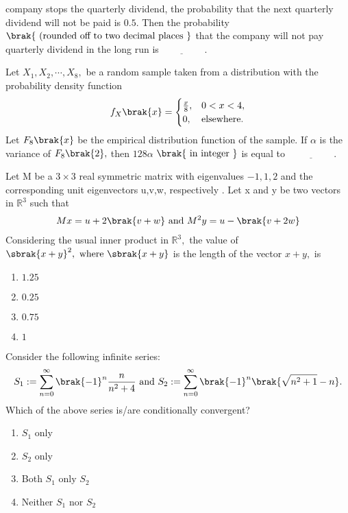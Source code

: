 company stops the quarterly dividend, the probability that the next quarterly dividend will not be paid is $0.5.$ Then the probability $\brak{\text{ (rounded
off to two decimal places }}$ that the company will not pay quarterly dividend in the long run is$\underline{\hspace{2cm}}.$
\bigskip
\item Let $X_{1},X_{2},\cdots,X_{8},$ be a random sample taken from a distribution with the probability density function
\begin{align*}
    f_{X}\brak{x} = 
\begin{cases} 
\frac{x}{8}, & 0 < x < 4, \\
0, & \text{elsewhere}.
\end{cases}
\end{align*}
Let $F_{8}\brak{x}$ be the empirical distribution function of the sample. If $\alpha$ is the variance of  $F_{8}\brak{2},$ then $128\alpha$  $\brak{\text{ in integer }}$  is equal to $\underline{\hspace{2cm}}.$
\bigskip
\item Let M be a $3\times3$ real symmetric matrix with eigenvalues $-1,1,2$ and the corresponding unit eigenvectors u,v,w, respectively . Let x and y be two vectors in $\mathbb{R}^{3}$ such that
\begin{align*}
    Mx=u+2\brak{v+w} \text{ and }  M^{2}y=u-\brak{v+2w}
\end{align*}
Considering the usual inner product in $\mathbb{R}^{3},$ the value of $\sbrak{x+y}^{2},\text{ where }\sbrak{x+y}$ is the length of the vector $x+y , $ is 
\begin{enumerate}
    \item $1.25$
    \item $0.25$
    \item $0.75$
    \item $1$
    
\end{enumerate}
\bigskip
\item Consider the following infinite series:
\begin{align*}
    S_{1}:=\sum_{n=0}^{\infty}\brak{-1}^{n}\frac{n}{n^{2}+4} \text{ and } S_{2}:=\sum_{n=0}^{\infty}\brak{-1}^{n}\brak{\sqrt{n^{2}+1}-n}. 
\end{align*}
Which of the above series is/are conditionally convergent?
\begin{enumerate}
    \item $S_{1}$ only
    \item $S_{2}$ only
    \item Both $S_{1} \text{ only } S_{2}$ 
    \item Neither  $S_{1} \text{ nor } S_{2}$ 
\end{enumerate}
